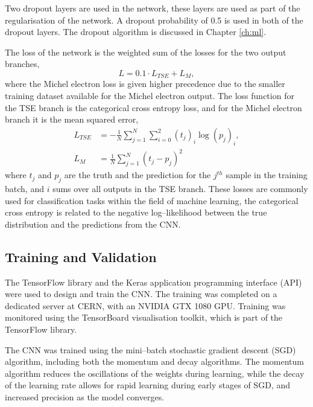 Two dropout layers are used in the network, these layers are used as part of the
regularisation of the network. A dropout probability of 0.5 is used in both of
the dropout layers. The dropout algorithm is discussed in Chapter \ref{ch:ml}.

The loss of the network is the weighted sum of the losses for the two output
branches,
\begin{equation*}
	L = 0.1 \cdot L_{TSE} + L_M,
\end{equation*}
where the Michel electron loss is given higher precedence due to the smaller
training dataset available for the Michel electron output. The loss function for
the TSE branch is the categorical cross entropy 
loss\cite{750fabedbacb467c8fafd98b87f77436}, and for the Michel electron branch
it is the mean squared error\cite{mse_springer},
\begin{align*}
	L_{TSE} &= - \frac{1}{N} \sum_{j=1}^N \sum_{i=0}^2 (t_j)_i \log (p_j)_i, \\
	L_M &= \frac{1}{N} \sum_{j=1}^N (t_j - p_j)^2
\end{align*}
where $t_j$ and $p_j$ are the truth and the prediction for the $j^{th}$ sample 
in the training batch, and $i$ sums over all outputs in the TSE branch. These
losses are commonly used for classification tasks within the field of machine 
learning, the categorical cross entropy is related to the negative
log--likelihood between the true distribution and the predictions from the 
CNN\cite{GoodfellowIan2016Dl}. 

\subsection{Training and Validation}
The TensorFlow\cite{45381} library and the Keras\cite{chollet2015keras} 
application programming interface (API) were used to design and train the CNN. 
The training was completed on a dedicated \protodune{} server at CERN, with an 
NVIDIA GTX 1080 GPU. Training was monitored using the TensorBoard visualisation 
toolkit\cite{tensorboard}, which is part of the TensorFlow library. 

The CNN was trained using the mini--batch stochastic gradient descent (SGD)
algorithm, including both the momentum and decay algorithms\cite{Reed1999}. 
The momentum algorithm reduces the oscillations of the weights during 
learning, while the decay of the learning rate allows for rapid learning 
during early stages of SGD, and increased precision as the model converges. 

